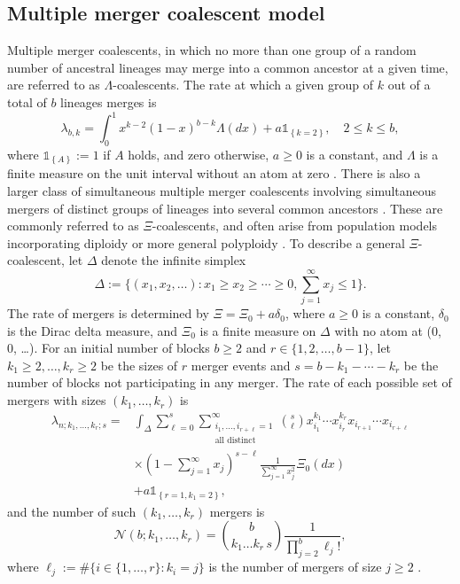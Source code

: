 \documentclass[9pt,twocolumn,twoside,lineno]{gsajnl}
\newcommand{\one}[1]{\ensuremath{\mathds{1}_{\left\{ #1 \right\}}}}%
\begin{document}
\subsection*{Multiple merger coalescent model}
\label{app-multiple-mergers}

Multiple merger coalescents, in which no more than one group of a random number of ancestral
lineages may merge into a common ancestor at a given time,
are referred to as $\Lambda$-coalescents.
The rate at which  a given group of $k$ out of a total of  $b$ lineages merges  is
\begin{equation}\label{lambdabk}
\lambda_{b, k} =  \int_0^1  x^{k-2}(1-x)^{b-k}\Lambda(dx) + a\one{k=2}, \quad 2 \le k \le b,
\end{equation}
where $\one{A} := 1$ if $A$ holds, and zero otherwise,
$a \geq 0$ is a constant, and $\Lambda$ is a finite measure on the
unit interval without an atom at zero \citep{DK99,P99,S99}.
There is also a larger class of simultaneous multiple merger coalescents involving
simultaneous mergers of distinct groups of lineages into several common ancestors \citep{S00}.
These are commonly referred to as $\Xi$-coalescents, and
often arise from population models incorporating diploidy or more general polyploidy
\citep{BBE13,blath2016site}.
To describe a general $\Xi$-coalescent, let $\Delta$ denote the
infinite simplex
\begin{equation*}
 \Delta := \Bigg\{ (x_1,x_2,  \ldots ): x_1 \ge x_2 \ge \cdots \ge 0, \sum_{j = 1}^{ \infty} x_j \le 1\Bigg\}.
 \end{equation*}
The rate of mergers is determined by
$\Xi = \Xi_0 + a\delta_0$, where $a \geq 0$ is a constant, $\delta_0$ is the Dirac delta
measure, and $\Xi_0$ is a finite measure on $\Delta$ with no atom at (0, 0, \ldots).
For an initial number of blocks $b \geq 2$ and
$r \in \{1,2, \ldots, b - 1 \}$, let $k_1 \geq 2, \ldots, k_r \ge 2$ be the sizes of $r$ merger events
and $s = b - k_1 - \cdots - k_r$ be the number of blocks not participating in any merger.
The rate of each possible set of mergers with sizes $(k_1, \ldots, k_r)$ is
\begin{align*}
  \lambda_{n; k_1, \ldots, k_r; s}  = {}&
\int_\Delta  \sum_{\ell = 0}^s
\sum_{\substack {i_1, \ldots, i_{r+\ell} = 1\\ \text{all distinct}} }^\infty
    \binom{s}{\ell} x_{i_1}^{k_1} \cdots  x_{i_{r}}^{k_r} x_{i_{r+1}} \cdots x_{i_{r+\ell}} \\
    & \times \left(1 - \sum_{j=1}^\infty x_j \right)^{s-\ell} \frac{1}{ \sum_{j=1}^\infty x_j^2 } \Xi_0(dx) \\
    & +  a\one{r=1, k_1 = 2},
\end{align*}
and the number of such $(k_1, \ldots, k_r)$ mergers is
\begin{equation*}
    \mathcal{N}(b; k_1, \ldots, k_r ) = \binom{b}{k_1 \ldots k_r\, s} \frac{1}{ \prod_{j=2}^b\ell_j!  },
\end{equation*}
where $\ell_j := \#\{ i \in \{ 1, \ldots, r \} : k_i = j \}$ is the number of mergers of size $j \geq 2$ \citep{S00}.
\end{document}
